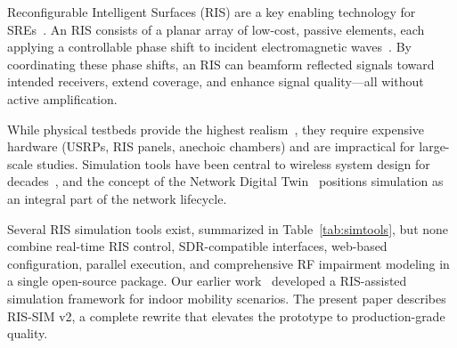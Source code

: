 \documentclass{article}
\begin{document}
Reconfigurable Intelligent Surfaces (RIS) are a key enabling technology for SREs~\cite{Appl_RIS_Wu}. An RIS consists of a planar array of low-cost, passive elements, each applying a controllable phase shift to incident electromagnetic waves~\cite{WC_RIS_basar}. By coordinating these phase shifts, an RIS can beamform reflected signals toward intended receivers, extend coverage, and enhance signal quality---all without active amplification.

While physical testbeds provide the highest realism~\cite{etsiRIS001,tsdsi2023,RISTA,6gbricks_d3_2_2024}, they require expensive hardware (USRPs, RIS panels, anechoic chambers) and are impractical for large-scale studies. Simulation tools have been central to wireless system design for decades~\cite{Survey_on_5G_simulations,survey_network_simulators}, and the concept of the Network Digital Twin~\cite{survey_simulator_emulator_testbed} positions simulation as an integral part of the network lifecycle.

Several RIS simulation tools exist, summarized in Table~\ref{tab:simtools}, but none combine real-time RIS control, SDR-compatible interfaces, web-based configuration, parallel execution, and comprehensive RF impairment modeling in a single open-source package. Our earlier work~\cite{WCL2025,NCC2025} developed a RIS-assisted simulation framework for indoor mobility scenarios. The present paper describes RIS-SIM v2, a complete rewrite that elevates the prototype to production-grade quality.

\begin{table}[t]
\caption{Comparison of RIS Simulation Tools and RIS-SIM v2}
\label{tab:simtools}
\centering
{}
\end{table}
\end{document}
